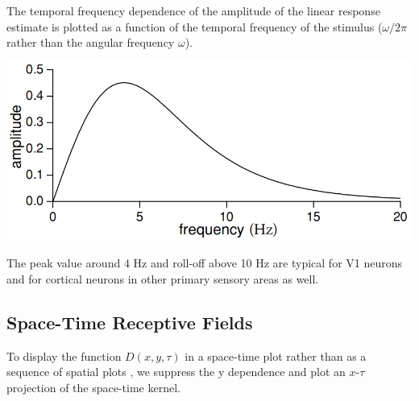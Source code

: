 \begin{exm}
  The temporal frequency dependence of the amplitude of the linear response estimate  is plotted as a function of the temporal frequency of the stimulus ($\omega/2\pi$ rather than the angular frequency $\omega$).
  \begin{center}
    \includegraphics[scale=0.25]{./png/frequencyAmplitude}
  \end{center}
  The peak value around 4 Hz and roll-off above 10 Hz are typical for V1 neurons and for cortical neurons in other primary sensory areas as well.
\end{exm}

\subsection{Space-Time Receptive Fields}
\label{sec:Space-TimeReceptiveFields}

\begin{rem}
  To display the function $D(x, y,\tau)$ in a space-time plot rather than as a sequence of spatial plots , we suppress the y dependence and plot an $x$-$\tau$ projection of the space-time kernel.
\end{rem}


